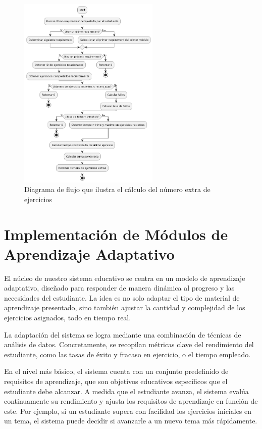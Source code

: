 \begin{figure}[H]
    \centering
    \includegraphics[width=0.6\textwidth]{imagenes/numeroejersextras.png}
    \caption{Diagrama de flujo que ilustra el cálculo del número extra de ejercicios}
    \label{fig:numextraejercicios}
\end{figure}

\section{Implementación de Módulos de Aprendizaje Adaptativo}

El núcleo de nuestro sistema educativo se centra en un modelo de aprendizaje adaptativo, diseñado para responder de manera dinámica al progreso y las necesidades del estudiante. La idea es no solo adaptar el tipo de material de aprendizaje presentado, sino también ajustar la cantidad y complejidad de los ejercicios asignados, todo en tiempo real.

La adaptación del sistema se logra mediante una combinación de técnicas de análisis de datos. Concretamente, se recopilan métricas clave del rendimiento del estudiante, como las tasas de éxito y fracaso en ejercicio, o el tiempo empleado. 

En el nivel más básico, el sistema cuenta con un conjunto predefinido de requisitos de aprendizaje, que son objetivos educativos específicos que el estudiante debe alcanzar. A medida que el estudiante avanza, el sistema evalúa continuamente su rendimiento y ajusta los requisitos de aprendizaje en función de este. Por ejemplo, si un estudiante supera con facilidad los ejercicios iniciales en un tema, el sistema puede decidir si avanzarle a un nuevo tema más rápidamente.

